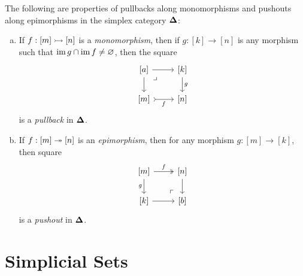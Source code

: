 \begin{lemma}
    \label{lem:splx-cat-pullback-mono-pushout-epi}
    The following are properties of pullbacks along monomorphisms and pushouts along
    epimorphisms in the simplex category \({\mathbf{\Delta}}\):
    \begin{enumerate}[(a)]\setlength\itemsep{0em}
        \item If \(f: [m] \rightarrowtail [n]\) is a \emph{monomorphism}, then if \(g: [k] \to
              [n]\) is any morphism such that \(\operatorname{im} g \cap \operatorname{im} f \neq \varnothing\), then the
              square
              \[
                  \begin{tikzcd}
                      {[a]}  \ar[r] \ar[d] \ar[rd, phantom, very near start, "\lrcorner"]
                      &{[k]} \ar[d, "g"] \\
                      {[m]} \ar[r, tail, "f"'] &{[n]}
                  \end{tikzcd}
              \]
              is a \emph{pullback} in \({\mathbf{\Delta}}\).
        \item If \(f: [m] \twoheadrightarrow [n]\) is an \emph{epimorphism}, then for any morphism
              \(g: [m] \to [k]\), then square
              \[
                  \begin{tikzcd}
                      {[m]} \ar[r, two heads, "f"] \ar[d, "g"']
                      \ar[dr, very near end, phantom, "\ulcorner"]
                      &{[n]} \ar[d] \\
                      {[k]} \ar[r] &{[b]}
                  \end{tikzcd}
              \]
              is a \emph{pushout} in \({\mathbf{\Delta}}\).
    \end{enumerate}
\end{lemma}



\section{Simplicial Sets}

